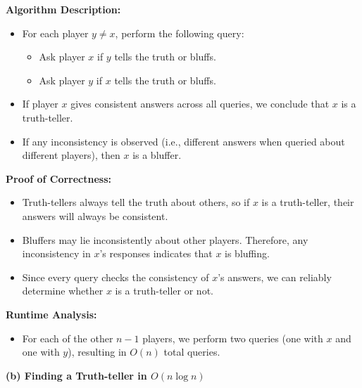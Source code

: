 \documentclass[11pt]{article}
\begin{document}
\textbf{Algorithm Description:}
\begin{itemize}
    \item For each player \(y \neq x\), perform the following query:
        \begin{itemize}
            \item Ask player \(x\) if \(y\) tells the truth or bluffs.
            \item Ask player \(y\) if \(x\) tells the truth or bluffs.
        \end{itemize}
    \item If player \(x\) gives consistent answers across all queries, we conclude that \(x\) is a truth-teller.
    \item If any inconsistency is observed (i.e., different answers when queried about different players), then \(x\) is a bluffer.
\end{itemize}

\textbf{Proof of Correctness:}
\begin{itemize}
    \item Truth-tellers always tell the truth about others, so if \(x\) is a truth-teller, their answers will always be consistent.
    \item Bluffers may lie inconsistently about other players. Therefore, any inconsistency in \(x\)'s responses indicates that \(x\) is bluffing.
    \item Since every query checks the consistency of \(x\)'s answers, we can reliably determine whether \(x\) is a truth-teller or not.
\end{itemize}

\textbf{Runtime Analysis:}
\begin{itemize}
    \item For each of the other \(n - 1\) players, we perform two queries (one with \(x\) and one with \(y\)), resulting in \(O(n)\) total queries.
\end{itemize}

\newpage
\textbf{(b) Finding a Truth-teller in \(O(n \log n)\)}
\end{document}
